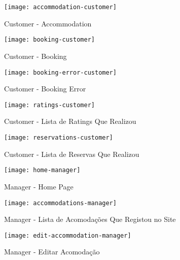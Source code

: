 \documentclass[11pt]{article}
\begin{document}
	\begin{figure}[!ht]
		\texttt{[image: accommodation-customer]}
		\centering
		\caption{Customer - Accommodation}
		\label{fig:customer-accommodation}
	\end{figure}

	\begin{figure}[!ht]
		\texttt{[image: booking-customer]}
		\centering
		\caption{Customer - Booking}
		\label{fig:customer-booking}
	\end{figure}

	\begin{figure}[!ht]
		\texttt{[image: booking-error-customer]}
		\centering
		\caption{Customer - Booking Error}
		\label{fig:customer-booking-error}
	\end{figure}

	\begin{figure}[!ht]
		\texttt{[image: ratings-customer]}
		\centering
		\caption{Customer - Lista de Ratings Que Realizou}
		\label{fig:customer-ratings}
	\end{figure}

	\begin{figure}[!ht]
		\texttt{[image: reservations-customer]}
		\centering
		\caption{Customer - Lista de Reservas Que Realizou}
		\label{fig:customer-reservations}
	\end{figure}

	\begin{figure}[!ht]
		\texttt{[image: home-manager]}
		\centering
		\caption{Manager - Home Page}
		\label{fig:manager-home-page}
	\end{figure}

	\begin{figure}[!ht]
		\texttt{[image: accommodations-manager]}
		\centering
		\caption{Manager - Lista de Acomodações Que Registou no Site}
		\label{fig:manager-accommodations}
	\end{figure}

	\begin{figure}[!ht]
		\texttt{[image: edit-accommodation-manager]}
		\centering
		\caption{Manager - Editar Acomodação}
		\label{fig:manager-edit-accommodation}
	\end{figure}
\end{document}

